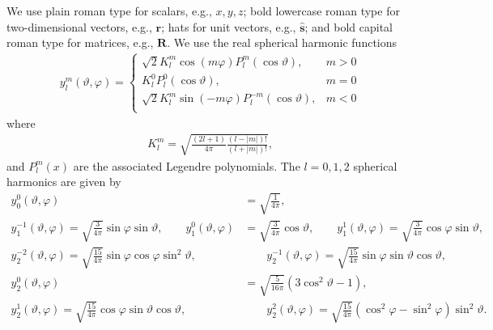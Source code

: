 \documentclass[11pt]{article}
\providecommand{\mb}[1]{\mathbf{#1}}
\begin{document}
We use plain roman type for scalars, e.g., $x, y, z$; bold lowercase roman type
for two-dimensional vectors, e.g., $\mb{r}$; hats for unit vectors, e.g.,
$\mb{\hat{s}}$; and bold capital roman type for matrices, e.g.,
$\mb{R}$. We use the real spherical harmonic functions
\begin{align}
  y_l^m(\vartheta, \varphi) =
  \begin{cases}
    \sqrt{2}K_l^m\cos(m\varphi)P_l^m(\cos\vartheta), & m > 0\\
    K_l^0P_l^0(\cos\vartheta), & m = 0\\
    \sqrt{2}K_l^m\sin(-m\varphi)P_l^{-m}(\cos\vartheta), & m < 0\\
  \end{cases}
\end{align}
where
\begin{align}
  K_l^m = \sqrt{\frac{(2l+1)}{4\pi}\frac{(l-|m|)!}{(l+|m|)!}},
\end{align}
and $P_l^m(x)$ are the associated Legendre polynomials. The $l=0, 1, 2$
spherical harmonics are given by
\begin{align}
  y_0^0(\vartheta, \varphi) &= \sqrt{\frac{1}{4\pi}}, \nonumber \\ 
  y_1^{-1}(\vartheta, \varphi) = \sqrt{\frac{3}{4\pi}}\sin\varphi\sin\vartheta, \hspace{2em} y_1^0(\vartheta, \varphi) &= \sqrt{\frac{3}{4\pi}}\cos\vartheta, \hspace{2em} y_1^1(\vartheta, \varphi) = \sqrt{\frac{3}{4\pi}}\cos\varphi\sin\vartheta, \nonumber \\
  y_2^{-2}(\vartheta, \varphi) = \sqrt{\frac{15}{4\pi}}\sin\varphi\cos\varphi\sin^2\vartheta, &\hspace{2em} y_2^{-1}(\vartheta, \varphi) = \sqrt{\frac{15}{4\pi}}\sin\varphi\sin\vartheta\cos\vartheta,\nonumber \\
  y_2^0(\vartheta, \varphi) &= \sqrt{\frac{5}{16\pi}}(3\cos^2\vartheta - 1), \nonumber \\ 
  y_2^{1}(\vartheta, \varphi) = \sqrt{\frac{15}{4\pi}}\cos\varphi\sin\vartheta\cos\vartheta, &\hspace{2em} y_2^{2}(\vartheta, \varphi) = \sqrt{\frac{15}{4\pi}}(\cos^2\varphi - \sin^2\varphi)\sin^2\vartheta.\label{eq:harmonics}
\end{align}
\end{document}
